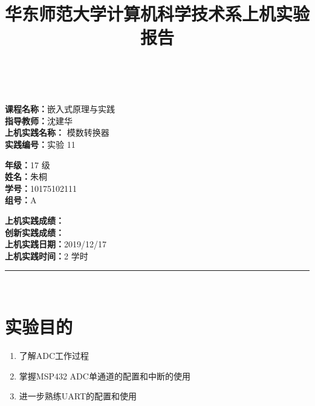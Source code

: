 \documentclass[a4paper,10pt,UTF8]{paper}
\title{华东师范大学计算机科学技术系上机实验报告}
\numberwithin{equation}{section}
\numberwithin{figure}{section}
\begin{document}
\pagestyle{fancy}
\lhead{}
\rhead{}
\makeatletter
\def\headrule{{\if@fancyplain\let\headrulewidth\plainheadrulewidth\fi%
    \color{gray}\hrule\@height 0.2pt\@width\headwidth}
    \vspace{6mm}}
\makeatother

\newcommand{\HRule}{\rule{\linewidth}{1mm}}
\newcommand{\dai}{\textbf{Dais-CMX16$^+$}}

{ \\ [0.8cm]
    
    \small{
        \begin{minipage}[t]{.32\linewidth}
            \textbf{课程名称：}嵌入式原理与实践\\
            \textbf{指导教师：}沈建华\\
            \textbf{上机实践名称：} 模数转换器\\
            \textbf{实践编号：}实验 11
        \end{minipage}
        \begin{minipage}[t]{.32\linewidth}
            \textbf{年级：}17 级\\
            \textbf{姓名：}朱桐\\
            \textbf{学号：}10175102111\\
            \textbf{组号：}A
        \end{minipage} 
        \begin{minipage}[t]{.32\linewidth}
            \textbf{上机实践成绩：} \\
            \textbf{创新实践成绩：} \\
            \textbf{上机实践日期：}2019/12/17\\
            \textbf{上机实践时间：}2 学时\\
        \end{minipage}
    }
    \HRule \\[0.5cm]
}



\section{实验目的}

\begin{enumerate}
    \item 了解ADC工作过程
    \item 掌握MSP432 ADC单通道的配置和中断的使用
    \item 进一步熟练UART的配置和使用
\end{enumerate}
\end{document}
